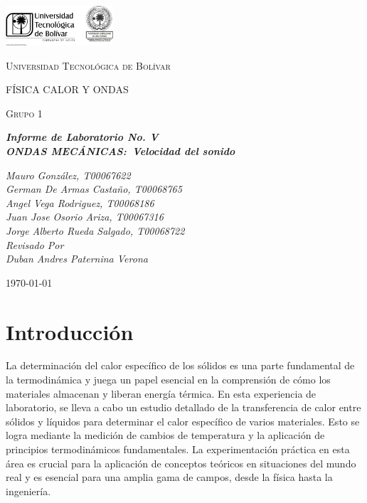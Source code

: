 \documentclass[letterpaper, 12pt]{article}
\begin{document}
\begin{titlepage}
      \centering
      \includegraphics[width=0.3\textwidth]{Images/logo_utb.png}\par\vspace{1cm}
      {\scshape\LARGE Universidad Tecnológica de Bolívar \par}
      \vspace{1cm}

      {\scshape\Large FÍSICA CALOR Y ONDAS \par}
      \vspace{.2cm}

      {\scshape\Large Grupo 1 \par}
      \vspace{1cm}
      \slshape {\Large \bfseries{}Informe de Laboratorio No. V\\}
      \slshape {\small \bfseries{}ONDAS MECÁNICAS:~Velocidad del sonido}
      \vspace{2cm}

      \slshape {\itshape{} Mauro González, T00067622 \\}
      \slshape {\itshape{} German De Armas Castaño, T00068765 \\}
      \slshape {\itshape{} Angel Vega Rodriguez, T00068186 \\}
      \slshape {\itshape{} Juan Jose Osorio Ariza, T00067316 \\}
      \slshape {\itshape{} Jorge Alberto Rueda Salgado, T00068722 \\}
      \vfill
      Revisado Por \\
      Duban Andres Paternina Verona\\
      {\large \today\par}
\end{titlepage}


\section{Introducción}

La determinación del calor específico de los sólidos es una
parte fundamental de la termodinámica y juega un papel
esencial en la comprensión de cómo los materiales almacenan
y liberan energía térmica. En esta experiencia de
laboratorio, se lleva a cabo un estudio detallado de la
transferencia de calor entre sólidos y líquidos para
determinar el calor específico de varios materiales. Esto
se logra mediante la medición de cambios de temperatura y
la aplicación de principios termodinámicos fundamentales.
La experimentación práctica en esta área es crucial para la
aplicación de conceptos teóricos en situaciones del mundo
real y es esencial para una amplia gama de campos, desde la
física hasta la ingeniería.
\end{document}
